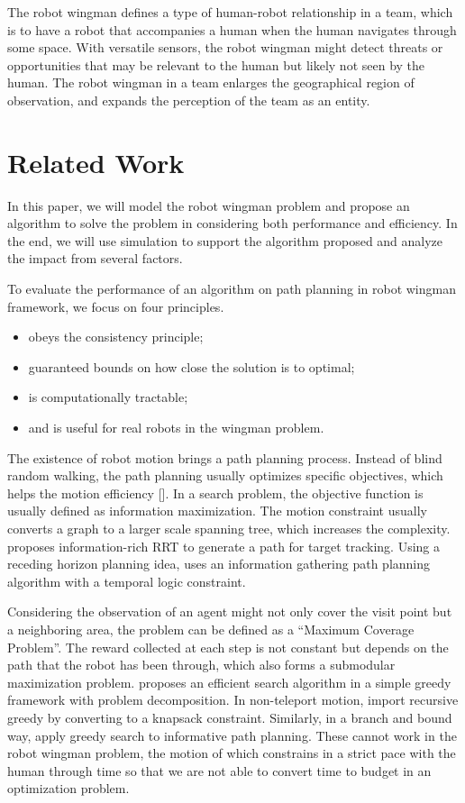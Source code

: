 \documentclass[12pt]{article}
\begin{document}
The robot wingman defines a type of human-robot relationship in a team, which is to have a robot that accompanies a human when the human navigates through
some space. With versatile sensors, the robot wingman might detect threats or opportunities that may be relevant to the human but likely not seen by the human. The robot wingman in a team enlarges the geographical region of observation, and expands the perception of the team as an entity.

\section{Related Work}

In this paper, we will model the robot wingman problem and propose an algorithm to solve the problem in considering both performance and efficiency. In the end, we will use simulation to support the algorithm proposed and analyze the impact from several factors. 

To evaluate the performance of an algorithm on path planning in robot wingman framework, we focus on four principles.
\begin{itemize}
\item obeys the consistency principle;
\item guaranteed bounds on how close the solution is to optimal;
\item is computationally tractable; 
\item and is useful for real robots in the wingman problem.
\end{itemize}

The existence of robot motion brings a path planning process. Instead of blind random walking, the path planning usually optimizes specific objectives, which helps the motion efficiency [\cite{goodrich2013toward}]. In a search problem, the objective function is usually defined as information maximization. The motion constraint usually converts a graph to a larger scale spanning tree, which increases the complexity. \cite{levine2010information} proposes information-rich RRT to generate a path for target tracking. Using a receding horizon planning idea, \cite{JonesSchwagerBeltaICRA13scLTLInfo} uses an information gathering path planning algorithm with a temporal logic constraint.

Considering the observation of an agent might not only cover the visit point but a neighboring area, the problem can be defined as a ``Maximum Coverage Problem''. The reward collected at each step is not constant but depends on the path that the robot has been through, which also forms a submodular maximization problem. \cite{singh2009efficient} proposes an efficient search algorithm in a simple greedy framework with problem decomposition. In non-teleport motion, \cite{chekuri2005recursive} import recursive greedy by converting to a knapsack constraint. Similarly, in a branch and bound way, \cite{binney2012branch} apply greedy search to informative path planning. These cannot work in the robot wingman problem, the motion of which constrains in a strict pace with the human through time so that we are not able to convert time to budget in an optimization problem.
\end{document}
